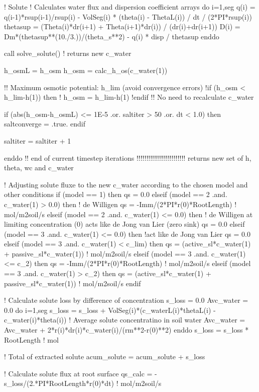     ! Solute
    ! Calculates water flux and dispersion coefficient arrays
    do i=1,seg
      q(i) = q(i-1)*rsup(i-1)/rsup(i) - VolSeg(i) * (theta(i) - ThetaL(i)) / dt / (2*PI*rsup(i))
      thetasup = (Theta(i)*dr(i+1) + Theta(i+1)*dr(i)) / (dr(i)+dr(i+1))
      D(i) = Dm*(thetasup**(10./3.))/(theta_s**2) - q(i) * disp / thetasup
    enddo

    call solve_solute()   ! returns new c_water

 
    h_osmL = h_osm
    h_osm = calc_h_os(c_water(1))
    
    !! Maximum osmotic potential: h_lim (avoid convergence errors)
    !if (h_osm < h_lim-h(1)) then
    !  h_osm = h_lim-h(1)
    !endif
    !! No need to recalculate c_water

    if (abs(h_osm-h_osmL) <= 1E-5 .or. saltiter > 50 .or. dt < 1.0) then
      saltconverge = .true.
    endif

    saltiter = saltiter + 1

        
  enddo  !! end of current timestep iterations  !!!!!!!!!!!!!!!!!!!!!!!!! returns new set of h, theta, wc and c_water
  
  ! Adjusting solute fluxe to the new c_water according to the chosen model and other conditions
  if (model == 1) then
    qs = 0.0
  elseif (model == 2 .and. c_water(1) > 0.0) then	! de Willigen
    qs = -Imm/(2*PI*r(0)*RootLength)			! mol/m2soil/s
  elseif (model == 2 .and. c_water(1) <= 0.0) then	! de Willigen at limiting concentration (0) acts like de Jong van Lier (zero sink)
    qs = 0.0
  elseif (model == 3 .and. c_water(1) <= 0.0) then 	!act like de Jong van Lier
    qs = 0.0
  elseif (model == 3 .and. c_water(1) < c_lim) then
    qs = (active_sl*c_water(1) + passive_sl*c_water(1)) ! mol/m2soil/s
  elseif (model == 3 .and. c_water(1) <= c_2) then
    qs = -Imm/(2*PI*r(0)*RootLength)			! mol/m2soil/s
  elseif (model == 3 .and. c_water(1) > c_2) then 
    qs = (active_sl*c_water(1) + passive_sl*c_water(1)) ! mol/m2soil/s
  endif 

  ! Calculate solute loss by difference of concentration
  s_loss = 0.0
  Avc_water = 0.0
  do i=1,seg
    s_loss = s_loss + VolSeg(i)*(c_waterL(i)*thetaL(i) - c_water(i)*theta(i))
    ! Average solute concentratino in soil water
    Avc_water = Avc_water + 2*r(i)*dr(i)*c_water(i)/(rm**2-r(0)**2)
  enddo
  s_loss = s_loss * RootLength	! mol
  
  ! Total of extracted solute
  acum_solute = acum_solute + s_loss

  ! Calculate solute flux at root surface
  qs_calc = -s_loss/(2.*PI*RootLength*r(0)*dt)		! mol/m2soil/s

